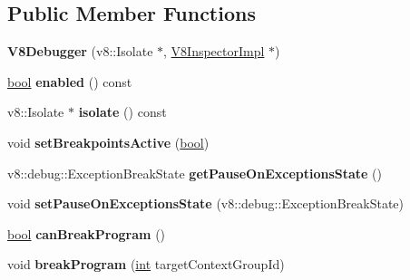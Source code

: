\subsection*{Public Member Functions}
\begin{DoxyCompactItemize}
\item 
\mbox{\label{classv8__inspector_1_1V8Debugger_a54051f598ecad058c92f40bebd1270f7}} 
{\bfseries V8\+Debugger} (v8\+::\+Isolate $\ast$, \mbox{\hyperlink{classv8__inspector_1_1V8InspectorImpl}{V8\+Inspector\+Impl}} $\ast$)
\item 
\mbox{\label{classv8__inspector_1_1V8Debugger_af25c00f64b9c1f87a633364f273ef212}} 
\mbox{\hyperlink{classbool}{bool}} {\bfseries enabled} () const
\item 
\mbox{\label{classv8__inspector_1_1V8Debugger_a91ede5aea04429bdda9444127c37bc27}} 
v8\+::\+Isolate $\ast$ {\bfseries isolate} () const
\item 
\mbox{\label{classv8__inspector_1_1V8Debugger_a851f56d03edb15e4aa9d3605bfe937e9}} 
void {\bfseries set\+Breakpoints\+Active} (\mbox{\hyperlink{classbool}{bool}})
\item 
\mbox{\label{classv8__inspector_1_1V8Debugger_a0bf3332d61b5b42bc945d25cc89a49d1}} 
v8\+::debug\+::\+Exception\+Break\+State {\bfseries get\+Pause\+On\+Exceptions\+State} ()
\item 
\mbox{\label{classv8__inspector_1_1V8Debugger_af135f238df4a1b0cf2aa47cee2123076}} 
void {\bfseries set\+Pause\+On\+Exceptions\+State} (v8\+::debug\+::\+Exception\+Break\+State)
\item 
\mbox{\label{classv8__inspector_1_1V8Debugger_ab632fdcb848ea917723f5ee71869b286}} 
\mbox{\hyperlink{classbool}{bool}} {\bfseries can\+Break\+Program} ()
\item 
\mbox{\label{classv8__inspector_1_1V8Debugger_aaaf0c6a9a2b663a371c752a4ff299b3a}} 
void {\bfseries break\+Program} (\mbox{\hyperlink{classint}{int}} target\+Context\+Group\+Id)

\end{DoxyCompactItemize}
